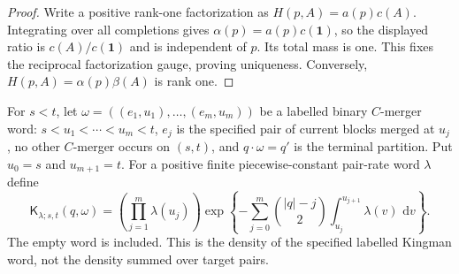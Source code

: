 \documentclass[11pt]{article}
\newcommand{\one}{\mathbf 1}
\newcommand{\dd}{\,\mathrm d}
\begin{document}
\begin{proof}
Write a positive rank-one factorization as $H(p,A)=a(p)c(A)$.  Integrating over all completions gives $\alpha(p)=a(p)c(\one)$, so the displayed ratio is $c(A)/c(\one)$ and is independent of $p$.  Its total mass is one.  This fixes the reciprocal factorization gauge, proving uniqueness.  Conversely, $H(p,A)=\alpha(p)\beta(A)$ is rank one.
\end{proof}

For $s<t$, let $\omega=((e_1,u_1),\ldots,(e_m,u_m))$ be a labelled binary $C$-merger word: $s<u_1<\cdots<u_m<t$, $e_j$ is the specified pair of current blocks merged at $u_j$, no other $C$-merger occurs on $(s,t)$, and $q\mathbin{\cdot}\omega=q'$ is the terminal partition.  Put $u_0=s$ and $u_{m+1}=t$.  For a positive finite piecewise-constant pair-rate word $\lambda$ define
\begin{equation}
\mathsf K_{\lambda;s,t}(q,\omega)=
\left(\prod_{j=1}^m\lambda(u_j)\right)
\exp\!\left\{-\sum_{j=0}^{m}\binom{|q|-j}{2}
\int_{u_j}^{u_{j+1}}\lambda(v)\,\dd v\right\}.
\label{eq:kingman-word}
\end{equation}
The empty word is included.  This is the density of the specified labelled Kingman word, not the density summed over target pairs.
\end{document}
